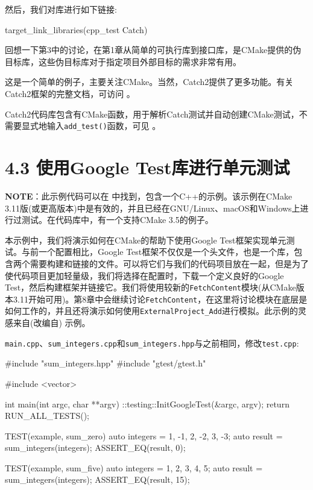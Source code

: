 然后，我们对库进行如下链接:

\begin{codebox}[cmake]
target_link_libraries(cpp_test Catch)
\end{codebox}

回想一下第3中的讨论，在第1章从简单的可执行库到接口库，是CMake提供的伪目标库，这些伪目标库对于指定项目外部目标的需求非常有用。


这是一个简单的例子，主要关注CMake。当然，Catch2提供了更多功能。有关Catch2框架的完整文档，可访问  。

Catch2代码库包含有CMake函数，用于解析Catch测试并自动创建CMake测试，不需要显式地输入\texttt{add\_test()}函数，可见  。


\section{4.3 使用Google Test库进行单元测试}

\begin{myInfoBox}
\textbf{NOTE}：此示例代码可以在  中找到，包含一个C++的示例。该示例在CMake 3.11版(或更高版本)中是有效的，并且已经在GNU/Linux、macOS和Windows上进行过测试。在代码库中，有一个支持CMake 3.5的例子。
\end{myInfoBox}

本示例中，我们将演示如何在CMake的帮助下使用Google Test框架实现单元测试。与前一个配置相比，Google Test框架不仅仅是一个头文件，也是一个库，包含两个需要构建和链接的文件。可以将它们与我们的代码项目放在一起，但是为了使代码项目更加轻量级，我们将选择在配置时，下载一个定义良好的Google Test，然后构建框架并链接它。我们将使用较新的\texttt{FetchContent}模块(从CMake版本3.11开始可用)。第8章中会继续讨论\texttt{FetchContent}，在这里将讨论模块在底层是如何工作的，并且还将演示如何使用\texttt{ExternalProject\_Add}进行模拟。此示例的灵感来自(改编自)  示例。


\texttt{main.cpp}、\texttt{sum\_integers.cpp}和\texttt{sum\_integers.hpp}与之前相同，修改\texttt{test.cpp}:

\begin{codebox}[cpp]
#include "sum_integers.hpp"
#include "gtest/gtest.h"

#include <vector>

int main(int argc, char **argv) {
  ::testing::InitGoogleTest(&argc, argv);
  return RUN_ALL_TESTS();
}

TEST(example, sum_zero) {
  auto integers = {1, -1, 2, -2, 3, -3};
  auto result = sum_integers(integers);
  ASSERT_EQ(result, 0);
}

TEST(example, sum_five) {
  auto integers = {1, 2, 3, 4, 5};
  auto result = sum_integers(integers);
  ASSERT_EQ(result, 15);
}
\end{codebox}

